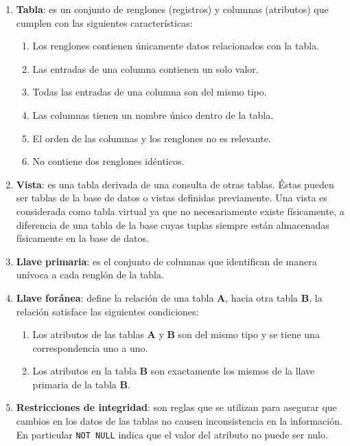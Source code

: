 \begin{enumerate}
	\item \textbf{Tabla}: es un conjunto de renglones (registros) y columnas (atributos) que cumplen con las siguientes características\cite{DataBaseConcepts}:
	\begin{enumerate}
		\item Los renglones contienen únicamente datos relacionados con la tabla.
		\item Las entradas de una columna contienen un solo valor.
		\item Todas las entradas de una columna son del mismo tipo.
		\item Las columnas tienen un nombre único dentro de la tabla.
		\item El orden de las columnas y los renglones no es relevante.
		\item No contiene dos renglones idénticos.
	\end{enumerate}
	\item \textbf{Vista}: es una tabla derivada de una consulta de otras tablas. Éstas pueden ser tablas de la base de datos o vistas definidas previamente. Una vista es considerada como tabla virtual ya que no necesariamente existe físicamente, a diferencia de una tabla de la base cuyas tuplas siempre están almacenadas físicamente en la base de datos\cite{FundamentalsOfDBSystems}.
	\item \textbf{Llave primaria}: es el conjunto de columnas que identifican de manera unívoca a cada renglón de la tabla.\cite{DataBaseConcepts}
	\item \textbf{Llave foránea}: define la relación de una tabla \textbf{A}, hacia otra tabla \textbf{B}, la relación satisface las siguientes condiciones\cite{FundamentalsOfDBSystems, DataBaseConcepts}:
	\begin{enumerate}
		\item Los atributos de las tablas \textbf{A} y \textbf{B} son del mismo tipo y se tiene una correspondencia uno a uno.
		\item Los atributos en la tabla \textbf{B} son exactamente los mismos de la llave primaria de la tabla \textbf{B}.
	\end{enumerate}
	\item \textbf{Restricciones de integridad}: son reglas que se utilizan para asegurar que cambios en los datos de las tablas no causen inconsistencia en la información\cite{DatabaseSystemConcepts}. En particular \texttt{NOT NULL} indica que el valor del atributo no puede ser nulo\cite{FundamentosSistemasBasesDatos}.

\end{enumerate}
